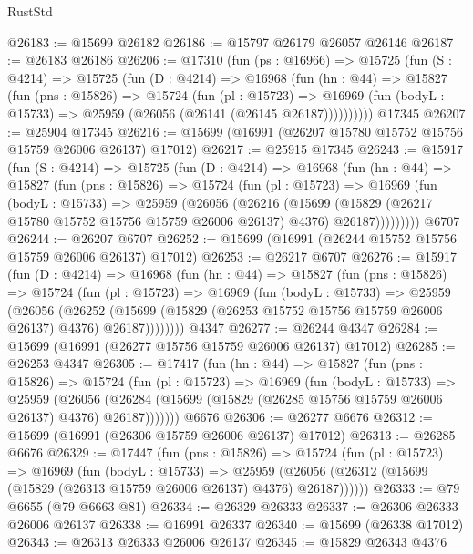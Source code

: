 \begin{lexlean}{RustStd}
\begin{coremodule}
@26183 := @15699 @26182
@26186 := @15797 @26179 @26057 @26146
@26187 := @26183 @26186
@26206 := @17310
    (fun (ps : @16966) =>
    @15725
      (fun (S : @4214) =>
      @15725
        (fun (D : @4214) =>
        @16968
          (fun (hn : @44) =>
          @15827
            (fun (pns : @15826) =>
            @15724
              (fun (pl : @15723) =>
              @16969 (fun (bodyL : @15733) => @25959 (@26056 (@26141 (@26145 @26187))))))))))
    @17345
@26207 := @25904 @17345
@26216 := @15699 (@16991 (@26207 @15780 @15752 @15756 @15759 @26006 @26137) @17012)
@26217 := @25915 @17345
@26243 := @15917
    (fun (S : @4214) =>
    @15725
      (fun (D : @4214) =>
      @16968
        (fun (hn : @44) =>
        @15827
          (fun (pns : @15826) =>
          @15724
            (fun (pl : @15723) =>
            @16969
              (fun (bodyL : @15733) =>
              @25959
                (@26056
                  (@26216
                    (@15699
                      (@15829 (@26217 @15780 @15752 @15756 @15759 @26006 @26137) @4376)
                      @26187)))))))))
    @6707
@26244 := @26207 @6707
@26252 := @15699 (@16991 (@26244 @15752 @15756 @15759 @26006 @26137) @17012)
@26253 := @26217 @6707
@26276 := @15917
    (fun (D : @4214) =>
    @16968
      (fun (hn : @44) =>
      @15827
        (fun (pns : @15826) =>
        @15724
          (fun (pl : @15723) =>
          @16969
            (fun (bodyL : @15733) =>
            @25959
              (@26056
                (@26252
                  (@15699 (@15829 (@26253 @15752 @15756 @15759 @26006 @26137) @4376) @26187))))))))
    @4347
@26277 := @26244 @4347
@26284 := @15699 (@16991 (@26277 @15756 @15759 @26006 @26137) @17012)
@26285 := @26253 @4347
@26305 := @17417
    (fun (hn : @44) =>
    @15827
      (fun (pns : @15826) =>
      @15724
        (fun (pl : @15723) =>
        @16969
          (fun (bodyL : @15733) =>
          @25959
            (@26056
              (@26284 (@15699 (@15829 (@26285 @15756 @15759 @26006 @26137) @4376) @26187)))))))
    @6676
@26306 := @26277 @6676
@26312 := @15699 (@16991 (@26306 @15759 @26006 @26137) @17012)
@26313 := @26285 @6676
@26329 := @17447
    (fun (pns : @15826) =>
    @15724
      (fun (pl : @15723) =>
      @16969
        (fun (bodyL : @15733) =>
        @25959 (@26056 (@26312 (@15699 (@15829 (@26313 @15759 @26006 @26137) @4376) @26187))))))
@26333 := @79 @6655 (@79 @6663 @81)
@26334 := @26329 @26333
@26337 := @26306 @26333 @26006 @26137
@26338 := @16991 @26337
@26340 := @15699 (@26338 @17012)
@26343 := @26313 @26333 @26006 @26137
@26345 := @15829 @26343 @4376

\end{coremodule}
\end{lexlean}
